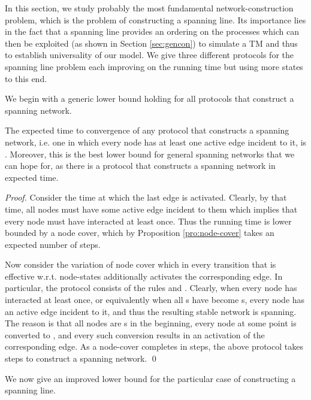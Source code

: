 \documentclass[oribibl, 11pt]{llncs}
\begin{document}
In this section, we study probably the most fundamental network-construction problem, which is the problem of constructing a spanning line. Its importance lies in the fact that a spanning line provides an ordering on the processes which can then be exploited (as shown in Section \ref{sec:gencon}) to simulate a TM and thus to establish universality of our model. We give three different protocols for the spanning line problem each improving on the running time but using more states to this end.

We begin with a generic lower bound holding for all protocols that construct a spanning network.  

\begin{theorem} 
The expected time to convergence of any protocol that constructs a spanning network, i.e. one in which every node has at least one active edge incident to it, is . Moreover, this is the best lower bound for general spanning networks that we can hope for, as there is a protocol that constructs a spanning network in  expected time.
\end{theorem}
\begin{proof}
Consider the time at which the last edge is activated. Clearly, by that time, all nodes must have some active edge incident to them which implies that every node must have interacted at least once. Thus the running time is lower bounded by a node cover, which by Proposition \ref{pro:node-cover} takes an expected number of  steps.

Now consider the variation of node cover which in every transition that is effective w.r.t. node-states additionally activates the corresponding edge. In particular, the protocol consists of the rules  and . Clearly, when every node has interacted at least once, or equivalently when all s have become s, every node has an active edge incident to it, and thus the resulting stable network is spanning. The reason is that all nodes are s in the beginning, every node at some point is converted to , and every such conversion results in an activation of the corresponding edge. As a node-cover completes in  steps, the above protocol takes  steps to construct a spanning network.
\qed
\end{proof}

We now give an improved lower bound for the particular case of constructing a spanning line.
\end{document}
